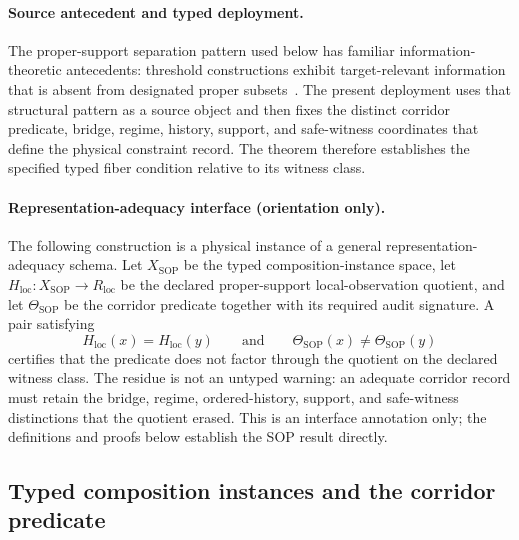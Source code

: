 \documentclass[11pt]{article}
\theoremstyle{definition}
\begin{document}
\paragraph{Source antecedent and typed deployment.}
The proper-support separation pattern used below has familiar information-theoretic
antecedents: threshold constructions exhibit target-relevant information that is
absent from designated proper subsets~\cite{S_Shamir1979}. The present deployment
uses that structural pattern as a source object and then fixes the distinct
corridor predicate, bridge, regime, history, support, and safe-witness coordinates
that define the physical constraint record. The theorem therefore establishes the
specified typed fiber condition relative to its witness class.

\paragraph{Representation-adequacy interface (orientation only).}
The following construction is a physical instance of a general
representation-adequacy schema. Let $X_{\mathrm{SOP}}$ be the typed
composition-instance space, let
$H_{\mathrm{loc}}:X_{\mathrm{SOP}}\to R_{\mathrm{loc}}$ be the declared
proper-support local-observation quotient, and let
$\Theta_{\mathrm{SOP}}$ be the corridor predicate together with its required
audit signature. A pair satisfying
\[
H_{\mathrm{loc}}(x)=H_{\mathrm{loc}}(y)
\qquad\text{and}\qquad
\Theta_{\mathrm{SOP}}(x)\neq\Theta_{\mathrm{SOP}}(y)
\]
certifies that the predicate does not factor through the quotient on the declared
witness class. The residue is not an untyped warning: an adequate corridor record
must retain the bridge, regime, ordered-history, support, and safe-witness
distinctions that the quotient erased. This is an interface annotation only; the
definitions and proofs below establish the SOP result directly.

\subsection{Typed composition instances and the corridor predicate}
\label{supp:typed-composition-instance}
\end{document}
